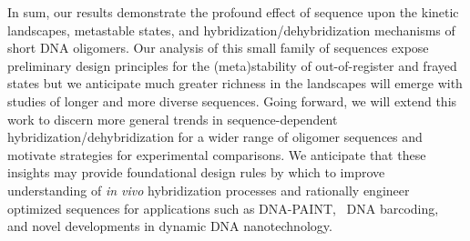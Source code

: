 \documentclass[journal=jpcbfk,manuscript=article]{achemso}
\begin{document}
In sum, our results demonstrate the profound effect of sequence upon the kinetic landscapes, metastable states, and hybridization/dehybridization mechanisms of short DNA oligomers. Our analysis of this small family of sequences expose preliminary design principles for the (meta)stability of out-of-register and frayed states but we anticipate much greater richness in the landscapes will emerge with studies of longer and more diverse sequences. Going forward, we will extend this work to discern more general trends in sequence-dependent hybridization/dehybridization for a wider range of oligomer sequences and motivate strategies for experimental comparisons. We anticipate that these insights may provide foundational design rules by which to improve understanding of \emph{in vivo} hybridization processes and rationally engineer optimized sequences for applications such as DNA-PAINT,~\citep{Strauss2020UpDNA-PAINT} DNA barcoding,~\citep{Shah2019} and novel developments in dynamic DNA nanotechnology. 



\clearpage
\newpage

%


%

\end{document}
